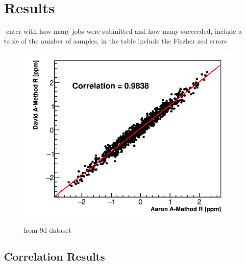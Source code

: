 
\graphicspath{{Body/Figures/Correlations/}}

\section{Results}


-enter with how many jobs were submitted and how many succeeded, include a table of the number of samples, in the table include the Fiszher zed errors


\begin{figure}[]
\centering
\includegraphics[width=\textwidth]{ScatterPlot}
\caption{from 9d dataset}
\label{fig:}
\end{figure}



\subsection{Correlation Results}




